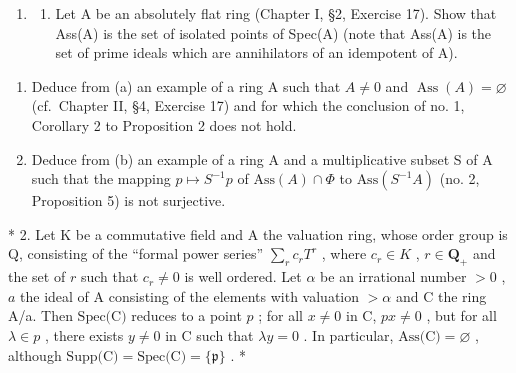 
\begin{enumerate}
\def\labelenumi{\arabic{enumi}.}
\tightlist
\item
  \begin{enumerate}
  \def\labelenumii{(\alph{enumii})}
  \tightlist
  \item
    Let A be an absolutely flat ring (Chapter I, §2, Exercise 17). Show that Ass(A) is the set of isolated points of Spec(A) (note that Ass(A) is the set of prime ideals which are annihilators of an idempotent of A).
  \end{enumerate}
\end{enumerate}

\begin{enumerate}
\def\labelenumi{(\alph{enumi})}
\setcounter{enumi}{1}
\item
  Deduce from (a) an example of a ring A such that \(A \neq 0\) and \(\operatorname{Ass}(A) = \varnothing\) (cf.~Chapter II, §4, Exercise 17) and for which the conclusion of no. 1, Corollary 2 to Proposition 2 does not hold.
\item
  Deduce from (b) an example of a ring A and a multiplicative subset S of A such that the mapping \(p \mapsto S^{-1}p\) of \(\text{Ass}(A) \cap \Phi\) to \(\text{Ass}(S^{-1}A)\) (no. 2, Proposition 5) is not surjective.
\end{enumerate}

* 2. Let K be a commutative field and A the valuation ring, whose order group is Q, consisting of the ``formal power series'' \(\sum_{r} c_r T^r\) , where \(c_r \in K\) , \(r \in \mathbf{Q}_+\) and the set of \(r\) such that \(c_r \neq 0\) is well ordered. Let \(\alpha\) be an irrational number \(>0\) , \(a\) the ideal of A consisting of the elements with valuation \(>\alpha\) and C the ring A/a. Then \(\text{Spec(C)}\) reduces to a point \(p\) ; for all \(x \neq 0\) in C, \(px \neq 0\) , but for all \(\lambda \in p\) , there exists \(y \neq 0\) in C such that \(\lambda y = 0\) . In particular, \(\text{Ass(C)} = \varnothing\) , although \(\text{Supp(C)} = \text{Spec(C)} = \{\mathfrak{p}\}\) . *

